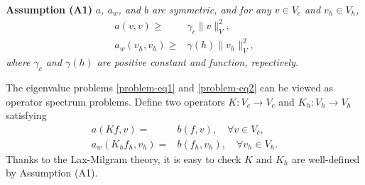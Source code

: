 \documentclass[leqno,CJK]{siamltex704}
\numberwithin{equation}{section}
\begin{document}
	\textbf{Assumption (A1)}\emph{
		$a$, $a_w$, and $b$ are symmetric, and
		for any $v\in V_c$ and $v_h\in V_h$,
		\begin{align*}
			a(v,v) \ge& \gamma_c\|v\|_V^2,
			\\
			a_w(v_h,v_h) \ge& \gamma(h)\|v_h\|_V^2,
		\end{align*}
		where $\gamma_c$ and $\gamma(h)$ are positive constant and function, repectively.
	}
	
	The eigenvalue problems \eqref{problem-eq1} and \eqref{problem-eq2} can be viewed as
	operator spectrum problems. Define two operators $K:V_c\rightarrow V_c$ and $K_h: V_h
	\rightarrow V_h$ satisfying
	\begin{align}
		a(Kf, v) =& b(f,v),\quad\forall v\in V_c,\label{vartion}
		\\
		a_w(K_h f_h,v_h) =& b(f_h,v_h),\quad\forall v_h\in V_h.
	\end{align}
	Thanks to the Lax-Milgram theory, it is easy to check $K$ and $K_h$ are well-defined by Assumption (A1).
	
	
	
\end{document}
